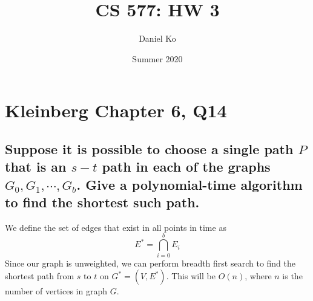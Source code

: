 \documentclass[11pt]{scrartcl}
\title{CS 577: HW 3}
\author{Daniel Ko}
\date{Summer 2020}
\newcommand{\opt}{\text{OPT}}
\begin{document}
\maketitle

\section{
  Kleinberg Chapter 6, Q14
 }

\subsection{
	Suppose it is possible to choose a single path $P$ that is an $s-t$ path in
	each of the graphs $G_0, G_1, \cdots , G_b$. Give a polynomial-time algorithm
	to find the shortest such path.
}
We define the set of edges that exist in all points in time as $$E^* = \bigcap_{i=0}^{b} E_i$$
Since our graph is unweighted, we can perform breadth first search to find the shortest path from
$s$ to $t$ on $G^* = (V, E^*)$. This will be $O(n)$, where $n$ is the number of vertices in graph $G$.

\iffalse
	We define $\delta(v,t)$ to be the length of the shortest
	path from $v$ to $t$.
	$$
		\delta(v,t) =
		\begin{cases}
			1                                                   & \textbf{when } (v, t) \in E^*             \\
			\infty                                              & \textbf{when } v \text{ has been visited} \\
			\min(\{ 1 + \delta(\phi,t) \mid (v,\phi) \in E^*\}) & \textbf{otherwise}                        \\
		\end{cases}
	$$
	Similiar to (6.23) from the book, we can modify the Bellman–Ford algorithm
	to find the shortest path from $s$ to $t$ that exists in all $G_i$. We define $\opt(i,v)$ to be the length of the shortest
	path from $v$ to $t$ using at most $i$ edges.
	$$\opt(i,v) =
		\begin{cases}
			\min \bigg(\opt(i-1,v),\min\Big(\{1 + \opt(i-1,w) \mid  (v,w) \in E^*\}\Big) \bigg) & \textbf{when } i > 0 \\
			0                                                                                   & \textbf{when } v = t \\
			\infty                                                                              & \textbf{otherwise}
		\end{cases}
	$$
\fi
\end{document}
